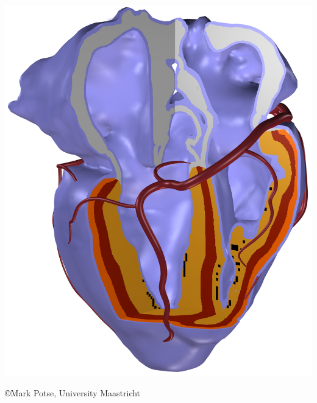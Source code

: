 \documentclass[12pt]{ICSPoster}
\begin{document}
\begin{posterbox}[2]
\begin{headerbox}[
        title=Background: Understanding Cardiac Resynchronization Therapy,
        height=0.23\textheight,
        width=0.47\textwidth]
\begin{minipage}{0.55\textwidth}
      \end{minipage}
      \begin{minipage}{0.25\textwidth}\sf
        \vspace{0.5cm}
        \hspace{1cm}
        \includegraphics[height=1.8\textwidth]{anatomy.png}
        \begin{flushright}
        {\tiny \copyright Mark Potse, University Maastricht}
        \end  {flushright}
      \end{minipage}


\end{headerbox}
\end{posterbox}
\end{document}
